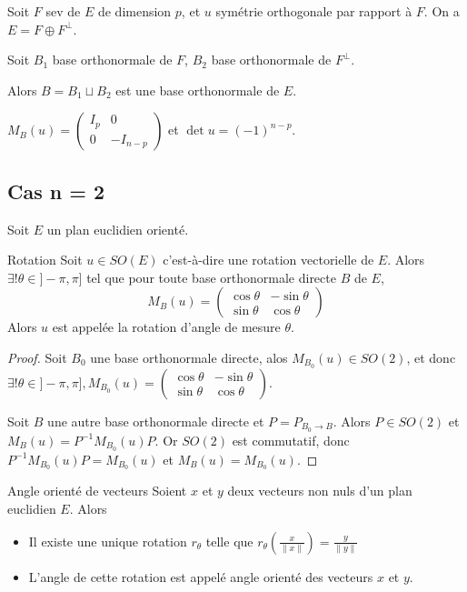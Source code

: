 Soit $F$ sev de $E$ de dimension $p$, et $u$ symétrie orthogonale par rapport à $F$. 
On a $E = F \oplus F^\perp$. 

Soit $B_1$ base orthonormale de $F$, $B_2$ base orthonormale de $F^\perp$. 

Alors $B = B_1 \sqcup B_2$ est une base orthonormale de $E$. 

$M_B(u) = \begin{pmatrix}
    I_p & 0 \\
    0 & - I_{n - p}
\end{pmatrix}$ et $\det u = (-1)^{n - p}$.

\subsection{Cas n = 2}

Soit $E$ un plan euclidien orienté. 

\begin{theoreme}{Rotation}{}
    Soit $u \in SO(E)$ c'est-à-dire une rotation vectorielle de $E$. 
    Alors $\exists ! \theta \in ]- \pi, \pi]$ tel que pour toute base orthonormale directe
    $B$ de $E$, 
$$M_B(u) = \begin{pmatrix}
    \cos \theta & -\sin \theta \\
    \sin \theta & \cos \theta
\end{pmatrix}$$
    Alors $u$ est appelée la rotation d'angle de mesure $\theta$. 
\end{theoreme}


\begin{proof}
    Soit $B_0$ une base orthonormale directe, alos 
    $M_{B_0}(u) \in SO(2)$, et donc 
    $\exists ! \theta \in ]- \pi, \pi], M_{B_0}(u) = \begin{pmatrix}
    \cos \theta & -\sin \theta \\
    \sin \theta & \cos \theta
\end{pmatrix}$.

    Soit $B$ une autre base orthonormale directe et $P = P_{B_0 \to B}$. Alors
    $P \in SO(2)$ et $M_B(u) = P^{-1} M_{B_0}(u) P$. 
    Or $SO(2)$ est commutatif, donc $P^{-1} M_{B_0}(u) P = M_{B_0}(u)$ et $M_B(u) = M_{B_0}(u)$.
\end{proof}

\begin{theoreme}{Angle orienté de vecteurs}{}
    Soient $x$ et $y$ deux vecteurs non nuls d'un plan euclidien $E$. Alors 
    \begin{itemize}
        \item Il existe une unique rotation $r_\theta$ telle que $r_\theta\left( \frac x {\| x \|} \right) = \frac y {\| y \|}$
        \item L'angle de cette rotation est appelé angle orienté des vecteurs $x$ et $y$.
    \end{itemize}
\end{theoreme}


